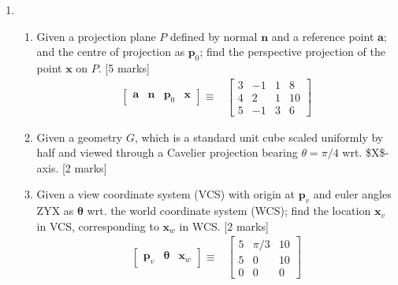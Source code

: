 \documentclass[11pt]{qptiet}
\begin{document}
\begin{enumerate}[resume]
\item \begin{enumerate}
\item Given a projection plane \(P\) defined by normal
\(\textbf{n}\) and a reference point \(\textbf{a}\);
and the centre of projection as \(\mathbf{p}_0\);
find the perspective projection of the point
\(\textbf{x}\) on \(P\). \hfill [5 marks]
\begin{align*}
  \begin{bmatrix}
    \mathbf{a}&\mathbf{n}&\mathbf{p}_0&\mathbf{x}
  \end{bmatrix}\equiv
  &
    \begin{bmatrix}
      3&-1&1&8\\4&2&1&10\\5&-1&3&6
    \end{bmatrix}
\end{align*}
\item Given a geometry \(G\), which is a standard unit
cube scaled uniformly by half and viewed through
a Cavelier projection bearing \(\theta=\pi/4\)
wrt. \$X\$-axis. \hfill [2 marks]
\item Given a view coordinate system (VCS) with origin
at \(\textbf{p}_v\) and euler angles ZYX as
\(\boldsymbol{\theta}\) wrt. the world coordinate
system (WCS); find the location \(\mathbf{x}_v\) in
VCS, corresponding to \(\textbf{x}_w\) in
WCS. \hfill [2 marks]
\begin{align*}
  \begin{bmatrix}
    \mathbf{p}_v & \boldsymbol{\theta} & \mathbf{x}_w
  \end{bmatrix}\equiv
  &\begin{bmatrix}
    5&\pi/3&10\\5&0&10\\0&0&0
  \end{bmatrix}
\end{align*}
\end{enumerate}
\end{enumerate}

\bvrhrule
\end{document}
